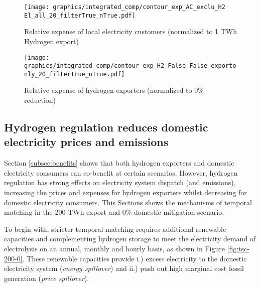\begin{figure*}[h!]
    \centering
    \begin{subfigure}[b]{0.49\linewidth}
        \centering
        \texttt{[image: graphics/integrated\_comp/contour\_exp\_AC\_exclu\_H2 El\_all\_20\_filterTrue\_nTrue.pdf]}
        \caption{Relative expense of local electricity customers (normalized to 1 TWh Hydrogen export)}
        \label{fig:expense_ac}
    \end{subfigure}
    \hfill
    \begin{subfigure}[b]{0.49\linewidth}
        \centering
        \texttt{[image: graphics/integrated\_comp/contour\_exp\_H2\_False\_False\_exportonly\_20\_filterTrue\_nTrue.pdf]}
        \caption{Relative expense of hydrogen exporters (normalized to 0\% \co reduction)}
        \label{fig:expense_h2}
    \end{subfigure}
    \hfill
    \caption{Normalized expenses of local electricity consumers (\ref{fig:expense_ac}) and hydrogen exporters (\ref{fig:expense_h2}). Local electricity consumers profit from increasing hydrogen exports, especially at low domestic mitigation and high exports. Hydrogen exporters profit from domestic mitigation at medium mitigation efforts.}
    \label{fig:expenses_default}
\end{figure*}


\subsection{Hydrogen regulation reduces domestic electricity prices and emissions}
\label{subsec:benefits_rule}

Section \ref{subsec:benefits} shows that both hydrogen exporters and domestic electricity consumers can co-benefit at certain scenarios. However, hydrogen regulation has strong effects on electricity system dispatch (and emissions), increasing the prices and expenses for hydrogen exporters whilst decreasing for domestic electricity consumers. This Sections shows the mechanisms of temporal matching in the 200 TWh export and 0\% domestic mitigation scenario.

To begin with, stricter temporal matching requires additional renewable capacities and complementing hydrogen storage to meet the electricity demand of electrolysis on an annual, monthly and hourly basis, as shown in Figure \ref{fig:tsc-200-0}. These renewable capacities provide i.) excess electricity to the domestic electricity system (\textit{energy spillover})  and ii.) push out high marginal cost fossil generation (\textit{price spillover}).


